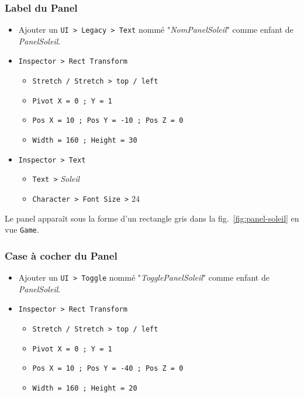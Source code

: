 \documentclass[a4paper,10pt]{article}
\newenvironment{solution}%
{\begin{tcolorbox}[breakable,colback=red!5!white,colframe=red!75!black,title=Solution]}%
{\end{tcolorbox}}
\begin{document}
\begin{solution}
\subsubsection{Label du Panel}
\begin{itemize}
	\item Ajouter un \texttt{UI > Legacy > Text} nommé "\textit{NomPanelSoleil}" comme enfant de \textit{PanelSoleil}.
	\item \texttt{Inspector > Rect Transform}
	\begin{itemize}
		\item \texttt{Stretch / Stretch > top / left}
			\item \texttt{Pivot X = 0 ; Y = 1}
		\item \texttt{Pos X = 10 ; Pos Y = -10 ; Pos Z = 0}
		\item \texttt{Width = 160 ; Height = 30}
	\end{itemize}
	
	\item \texttt{Inspector > Text}
	\begin{itemize}
		\item \texttt{Text >} \textit{Soleil}
		\item \texttt{Character > Font Size >} $24$
	\end{itemize}	
\end{itemize}

Le panel apparaît sous la forme d'un rectangle gris dans la fig.~\ref{fig:panel-soleil} en vue \texttt{Game}.

\subsubsection{Case à cocher du Panel}
\begin{itemize}
	\item Ajouter un \texttt{UI > Toggle} nommé "\textit{TogglePanelSoleil}" comme enfant de \textit{PanelSoleil}.
	\item \texttt{Inspector > Rect Transform}
	\begin{itemize}
		\item \texttt{Stretch / Stretch > top / left}
		\item \texttt{Pivot X = 0 ; Y = 1}
		\item \texttt{Pos X = 10 ; Pos Y = -40 ; Pos Z = 0}
		\item \texttt{Width = 160 ; Height = 20}	
	\end{itemize}
\end{itemize}


\end{solution}
\end{document}

